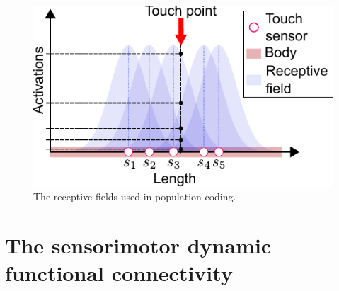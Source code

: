 \begin{figure}[!t]
	\begin{center}
		\hspace*{\fill}
		\includegraphics[width=0.99\columnwidth]{touch_receptive_fields.pdf}
		\hspace*{\fill}
	\end{center}
	\caption{\label{fig:population_coding} The receptive fields used in population coding.}
\end{figure}
\section{The sensorimotor dynamic functional connectivity}

